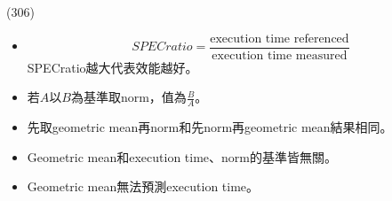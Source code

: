\item \begin{theorem}{(306)} \quad\quad \begin{itemize}
        \item \begin{equation}
            SPECratio = \frac{\text{execution time referenced}}{\text{execution time measured}}
        \end{equation} SPECratio越大代表效能越好。
        \item 若$A$以$B$為基準取norm，值為$\frac{B}{A}$。
        \item 先取geometric mean再norm和先norm再geometric mean結果相同。
        \item Geometric mean和execution time、norm的基準皆無關。
        \item Geometric mean無法預測execution time。
    \end{itemize} 
\end{theorem}
